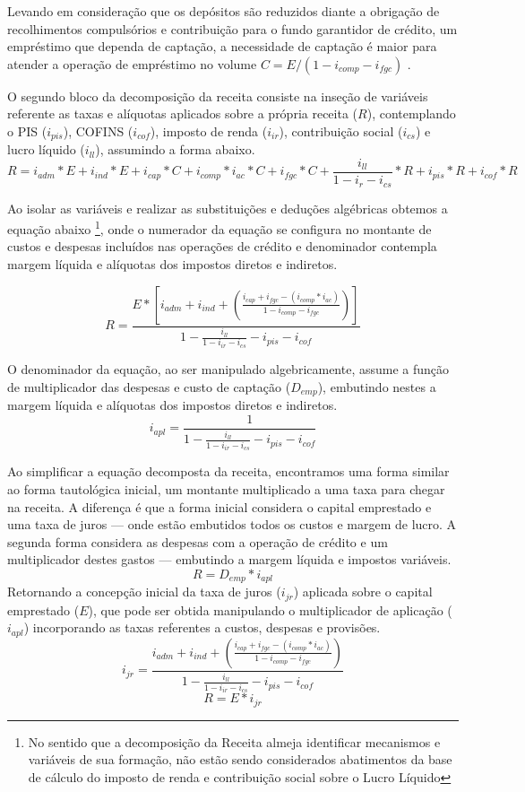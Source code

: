 \documentclass[12pt,12pt,openright,oneside,a4paper,chapter=TITLE,section=TITLE,subsection=TITLE,subsubsection=TITLE,english,french,spanish,portugues,sumario=tradicional]{abntex2}
\begin{document}
Levando em consideração que os depósitos são reduzidos diante a obrigação de recolhimentos compulsórios e contribuição para o fundo garantidor de crédito, um empréstimo que dependa de captação, a necessidade de captação é maior para atender a operação de empréstimo no volume \(C = E / (1 - i_{comp} - i_{fgc})\) \cite{cardoso:1999}.

O segundo bloco da decomposição da receita consiste na inseção de variáveis referente as taxas e alíquotas aplicados sobre a própria receita (\(R\)), contemplando o PIS (\(i_{pis}\)), COFINS (\(i_{cof}\)), imposto de renda (\(i_{ir}\)), contribuição social (\(i_{cs}\)) e lucro líquido (\(i_{ll}\)), assumindo a forma abaixo.
\[
R = i_{adm}*E + i_{ind}*E + i_{cap}*C + i_{comp}*i_{ac}*C + i_{fgc}*C + \frac{i_{ll}}{1 - i_{r} - i_{cs}}*R + i_{pis}*R + i_{cof}*R 
\]

Ao isolar as variáveis e realizar as substituições e deduções algébricas obtemos a equação abaixo \footnote{No sentido que a decomposição da Receita almeja identificar mecanismos e variáveis de sua formação, não estão sendo considerados abatimentos da base de cálculo do imposto de renda e contribuição social sobre o Lucro Líquido}, onde o numerador da equação se configura no montante de custos e despesas incluídos nas operações de crédito e denominador contempla margem líquida e alíquotas dos impostos diretos e indiretos.

\[
R =  \frac{E * [i_{adm} + i_{ind} + (\frac{i_{cap}+ i_{fgc} - (i_{comp}*i_{ac})}{1 - i_{comp} - i_{fgc}})]}
{1 -  \frac{i_{ll}}{1 - i_{ir}  - i_{cs}} - i_{pis} - i_{cof}}
\]

O denominador da equação, ao ser manipulado algebricamente, assume a função de multiplicador das despesas e custo de captação (\(D_{emp}\)), embutindo nestes a margem líquida e alíquotas dos impostos diretos e indiretos.
\[
i_{apl} = \frac{1}{1 -  \frac{i_{ll}}{1 - i_{ir}  - i_{cs}} - i_{pis} - i_{cof}}
\]

Ao simplificar a equação decomposta da receita, encontramos uma forma similar ao forma tautológica inicial, um montante multiplicado a uma taxa para chegar na receita. A diferença é que a forma inicial considera o capital emprestado e uma taxa de juros --- onde estão embutidos todos os custos e margem de lucro. A segunda forma considera as despesas com a operação de crédito e um multiplicador destes gastos --- embutindo a margem líquida e impostos variáveis.
\[
R = D_{emp} * i_{apl} 
\]
Retornando a concepção inicial da taxa de juros (\(i_{jr}\)) aplicada sobre o capital emprestado (\(E\)), que pode ser obtida manipulando o multiplicador de aplicação (\(i_{apl}\)) incorporando as taxas referentes a custos, despesas e provisões.
\[
i_{jr} = \frac{i_{adm} + i_{ind} + (\frac{i_{cap}+ i_{fgc} - (i_{comp}*i_{ac})}{1 - i_{comp} - i_{fgc}})}{1 -  \frac{i_{ll}}{1 - i_{ir}  - i_{cs}} - i_{pis} - i_{cof}}
\]
\[
R = E * i_{jr} 
\]
\end{document}
